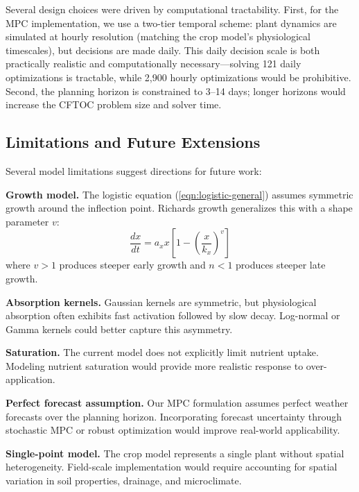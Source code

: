 \documentclass[preprint,12pt]{elsarticle}
\newcommand{\df}[2]{\displaystyle\frac{#1}{#2}}
\begin{document}
Several design choices were driven by computational tractability. First, for the MPC implementation, we use a two-tier temporal scheme: plant dynamics are simulated at hourly resolution (matching the crop model's physiological timescales), but decisions are made daily. This daily decision scale is both practically realistic and computationally necessary---solving 121 daily optimizations is tractable, while 2,900 hourly optimizations would be prohibitive. Second, the planning horizon is constrained to 3--14 days; longer horizons would increase the CFTOC problem size and solver time.

\subsection{Limitations and Future Extensions}\label{subsec:future-work}

Several model limitations suggest directions for future work:

\textbf{Growth model.} The logistic equation (\ref{eqn:logistic-general}) assumes symmetric growth around the inflection point. Richards growth generalizes this with a shape parameter $v$:
\begin{equation}
\df{dx}{dt} = a_{x}x\left[ 1 - \left( \df{x}{k_{x}} \right)^{v} \right]
\label{eqn:richards-growth}
\end{equation}
where $v > 1$ produces steeper early growth and $n < 1$ produces steeper late growth.

\textbf{Absorption kernels.} Gaussian kernels are symmetric, but physiological absorption often exhibits fast activation followed by slow decay. Log-normal or Gamma kernels could better capture this asymmetry.

\textbf{Saturation.} The current model does not explicitly limit nutrient uptake. Modeling nutrient saturation would provide more realistic response to over-application.

\textbf{Perfect forecast assumption.} Our MPC formulation assumes perfect weather forecasts over the planning horizon. Incorporating forecast uncertainty through stochastic MPC or robust optimization would improve real-world applicability.

\textbf{Single-point model.} The crop model represents a single plant without spatial heterogeneity. Field-scale implementation would require accounting for spatial variation in soil properties, drainage, and microclimate.
\end{document}
